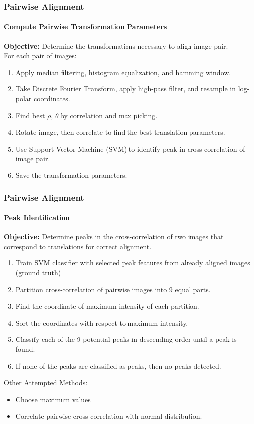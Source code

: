 \documentclass{beamer}
\begin{document}
\begin{frame}
\frametitle{Pairwise Alignment}
\framesubtitle{Compute Pairwise Transformation Parameters}
\textbf{Objective:} Determine the transformations necessary to align image pair. \\
For each pair of images:
\begin{enumerate}
\item Apply median filtering, histogram equalization, and hamming window. 
\item Take Discrete Fourier Transform, apply high-pass filter, and resample in log-polar coordinates. 
\item Find best $\rho$, $\theta$ by correlation and max picking. 
\item Rotate image, then correlate to find the best translation parameters.
\item Use Support Vector Machine (SVM) to identify peak in cross-correlation of image pair. 
\item Save the transformation parameters.
\end{enumerate}
\end{frame}

\begin{frame}
\frametitle{Pairwise Alignment}
\framesubtitle{Peak Identification}
\textbf{Objective:} Determine peaks in the cross-correlation of two images that correspond to translations for correct alignment. \\
\begin{enumerate}
\item Train SVM classifier with selected peak features from already aligned images (ground truth)
\item Partition cross-correlation of pairwise images into 9 equal parts.
\item Find the coordinate of maximum intensity of each partition.
\item Sort the coordinates with respect to maximum intensity.
\item Classify each of the 9 potential peaks in descending order until a peak is found.
\item If none of the peaks are classified as peaks, then no peaks detected.
\end{enumerate}
Other Attempted Methods:
\begin{itemize}
\item Choose maximum values
\item Correlate pairwise cross-correlation with normal distribution. 
\end{itemize}
\end{frame}
\end{document}

